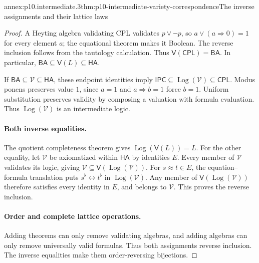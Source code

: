 \begin{annexitem}{annex:p10.intermediate.3}{thm:p10-intermediate-variety-correspondence}{The inverse assignments and their lattice laws}
\begin{proof}
A Heyting algebra validating CPL validates \(p\vee\neg p\), so
\(a\vee(a\Rightarrow0)=1\) for every element \(a\); the equational
theorem makes it Boolean.  The reverse inclusion follows from the
tautology calculation.  Thus \(\mathsf V(\mathsf{CPL})=\mathsf{BA}\).
In particular, \(\mathsf{BA}\subseteq\mathsf V(L)\subseteq\mathsf{HA}\).

If \(\mathsf{BA}\subseteq\mathcal V\subseteq\mathsf{HA}\), these
endpoint identities imply
\(\mathsf{IPC}\subseteq\operatorname{Log}(\mathcal V)\subseteq\mathsf{CPL}\).
Modus ponens preserves value \(1\), since \(a=1\) and
\(a\Rightarrow b=1\) force \(b=1\).
Uniform substitution preserves validity by composing a valuation
with formula evaluation.  Thus \(\operatorname{Log}(\mathcal V)\)
is an intermediate logic.

\paragraph{Both inverse equalities.}
The quotient completeness theorem gives
\(\operatorname{Log}(\mathsf V(L))=L\).
For the other equality, let \(\mathcal V\) be axiomatized within
\(\mathsf{HA}\) by identities \(E\).
Every member of \(\mathcal V\) validates its logic, giving
\(\mathcal V\subseteq\mathsf V(\operatorname{Log}(\mathcal V))\).
For \(s\approx t\in E\), the equation--formula translation puts
\(s^\flat\leftrightarrow t^\flat\) in \(\operatorname{Log}(\mathcal V)\).
Any member of \(\mathsf V(\operatorname{Log}(\mathcal V))\) therefore
satisfies every identity in \(E\), and belongs to \(\mathcal V\).
This proves the reverse inclusion.

\paragraph{Order and complete lattice operations.}
Adding theorems can only remove validating algebras, and adding
algebras can only remove universally valid formulas.
Thus both assignments reverse inclusion.  The inverse equalities
make them order-reversing bijections.


\end{proof}
\end{annexitem}
